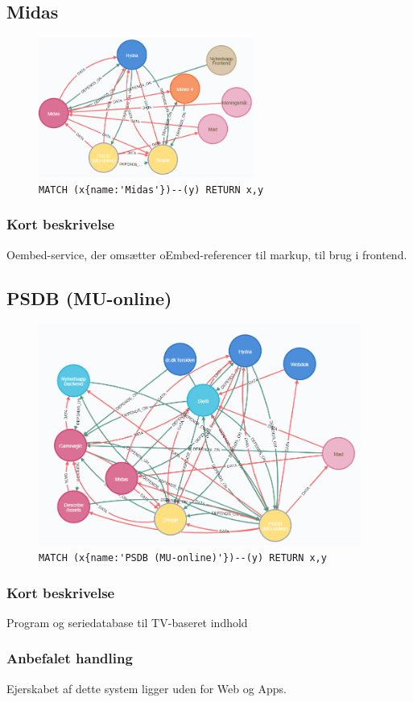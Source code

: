 \documentclass{article}
\begin{document}
\subsection{Midas}
\begin{figure}[H]
\includegraphics[width=200pt]{Midas.PNG}
\cprotect\caption{\verb|MATCH (x{name:'Midas'})--(y) RETURN x,y|}
\end{figure}
\subsubsection*{Kort beskrivelse}
Oembed-service, der omsætter oEmbed-referencer til markup, til brug i frontend.



\subsection{PSDB (MU-online)}
\begin{figure}[H]
\includegraphics[width=300pt]{PSDB.PNG}
\cprotect\caption{\verb|MATCH (x{name:'PSDB (MU-online)'})--(y) RETURN x,y|}
\end{figure}
\subsubsection*{Kort beskrivelse}
Program og seriedatabase til TV-baseret indhold
\subsubsection*{Anbefalet handling}
Ejerskabet af dette system ligger uden for Web og Apps.
\end{document}
